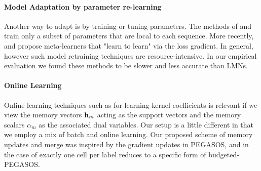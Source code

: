 \documentclass[letterpaper]{article} %
\newcommand{\vek}[1]{{\bf {#1}}}
\newcommand{\vh}{{\vek{h}}}
\begin{document}
\paragraph{Model Adaptation by parameter re-learning}
Another way to adapt is by training or tuning parameters. The methods of \cite{Rei15} and \cite{Huang2015MaximumAP} train only a subset of parameters that are local to each sequence.  More recently,\cite{Finn2017ModelAgnosticMF} and \cite{ravi17} propose meta-learners that "learn to learn" via
the loss gradient. In general, however such model retraining techniques are resource-intensive. In our empirical evaluation we found these methods to be slower and less accurate than LMNs.

\paragraph{Online Learning} Online learning techniques such as \cite{shalevshwartz:icml07} for learning kernel coefficients is relevant if we view the memory vectors $ \vh_m$ acting as the support vectors and the memory scalars $\alpha_m$ as the associated dual variables.  Our setup is a little different in that we employ a mix of batch and online learning. Our proposed scheme of memory updates and merge was inspired by the gradient updates in PEGASOS, and in the case of exactly one cell per label reduces to a specific form of budgeted-PEGASOS\cite{WangCV10}.


\end{document}
